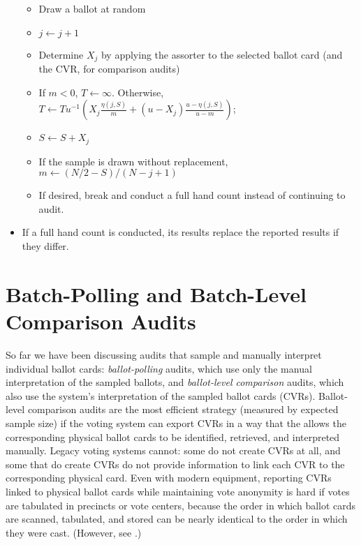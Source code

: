 \documentclass[aoas]{imsart}
\begin{document}
\begin{itemize}
   \begin{itemize}
        \item Draw a ballot at random
        \item $j \leftarrow j+1$
        \item Determine $X_j$ by applying the assorter to the selected ballot card (and the CVR, for comparison audits)
        \item If $m < 0$, $T \leftarrow \infty$. Otherwise, $T \leftarrow T u^{-1} \left ( X_j\frac{\eta(j, S)}{m} + (u-X_j) \frac{u-\eta(j,S)}{u-m} \right )$; 
        \item $S \leftarrow S+X_j$
        \item If the sample is drawn without replacement, $m \leftarrow (N/2 - S)/(N-j+1)$
        \item If desired, break and conduct a full hand count instead of continuing to audit. 
     \end{itemize}
     \item If a full hand count is conducted, its results replace the reported results if they differ.
\end{itemize}

\section{Batch-Polling and Batch-Level Comparison Audits} \label{sec:batch-audits}

So far we have been discussing audits that sample and manually interpret individual ballot cards: \emph{ballot-polling} audits,
which use only the manual interpretation of the sampled ballots, and \emph{ballot-level comparison} audits, which also use the system's
interpretation of the sampled ballot cards (CVRs).
Ballot-level comparison audits are the most efficient strategy (measured by expected sample size) if the voting system can export CVRs in a
way that the allows the corresponding physical ballot cards to be identified, retrieved, and interpreted manually.
Legacy voting systems cannot: some do not create CVRs at all, and some that do create CVRs do not provide information to link
each CVR to the corresponding physical card.
Even with modern equipment, reporting CVRs linked to physical ballot cards while maintaining vote anonymity is hard
if votes are tabulated in precincts or vote centers, because the order in which ballot cards are scanned, tabulated, and stored 
can be nearly identical to the order in which they were cast. 
(However, see \cite{stark22b}.)
\end{document}

